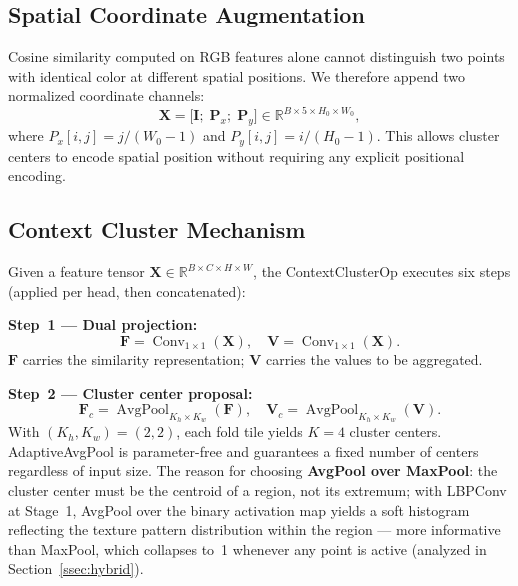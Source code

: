 \documentclass[conference]{IEEEtran}
\begin{document}
\subsection{Spatial Coordinate Augmentation}
\label{ssec:coord}

Cosine similarity computed on RGB features alone cannot distinguish
two points with identical color at different spatial positions.
We therefore append two normalized coordinate channels:
\begin{equation}
  \mathbf{X}=\bigl[\mathbf{I};\;\mathbf{P}_x;\;\mathbf{P}_y\bigr]
  \in\mathbb{R}^{B\times5\times H_0\times W_0},
  \label{eq:coord}
\end{equation}
where $P_x[i,j]=j/(W_0{-}1)$ and $P_y[i,j]=i/(H_0{-}1)$.
This allows cluster centers to encode spatial position without
requiring any explicit positional encoding.

\subsection{Context Cluster Mechanism}
\label{ssec:coc}

Given a feature tensor
$\mathbf{X}\in\mathbb{R}^{B\times C\times H\times W}$,
the ContextClusterOp executes six steps (applied per head, then
concatenated):

\noindent\textbf{Step~1 --- Dual projection:}
\begin{equation}
  \mathbf{F}=\operatorname{Conv}_{1\times1}(\mathbf{X}),\quad
  \mathbf{V}=\operatorname{Conv}_{1\times1}(\mathbf{X}).
  \label{eq:proj}
\end{equation}
$\mathbf{F}$ carries the similarity representation; $\mathbf{V}$
carries the values to be aggregated.

\noindent\textbf{Step~2 --- Cluster center proposal:}
\begin{equation}
  \mathbf{F}_c=\operatorname{AvgPool}_{K_h\times K_w}(\mathbf{F}),\quad
  \mathbf{V}_c=\operatorname{AvgPool}_{K_h\times K_w}(\mathbf{V}).
  \label{eq:centers}
\end{equation}
With $(K_h,K_w){=}(2,2)$, each fold tile yields $K{=}4$ cluster
centers. AdaptiveAvgPool is parameter-free and guarantees a fixed
number of centers regardless of input size.
The reason for choosing \textbf{AvgPool over MaxPool}: the cluster center must be the centroid of a region, not its extremum; with LBPConv at Stage~1, AvgPool over the binary activation map yields a soft histogram reflecting the texture pattern distribution within the region --- more informative than MaxPool, which collapses to~1 whenever any point is active (analyzed in Section~\ref{ssec:hybrid}).
\end{document}
